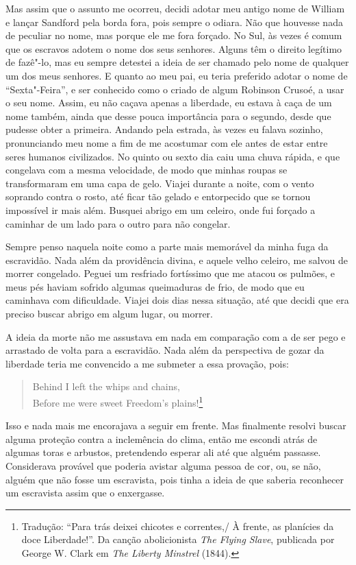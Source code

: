 Mas assim que o assunto me ocorreu, decidi adotar meu antigo nome de
William e lançar Sandford pela borda fora, pois sempre o odiara. Não que
houvesse nada de peculiar no nome, mas porque ele me fora forçado. No
Sul, às vezes é comum que os escravos adotem o nome dos seus senhores.
Alguns têm o direito legítimo de fazê"-lo, mas eu sempre detestei a ideia
de ser chamado pelo nome de qualquer um dos meus senhores. E quanto ao
meu pai, eu teria preferido adotar o nome de ``Sexta"-Feira'', e ser
conhecido como o criado de algum Robinson Crusoé, a usar o seu nome. 
Assim, eu não caçava apenas a liberdade, eu estava à caça de um nome
também, ainda que desse pouca importância para o segundo, desde que
pudesse obter a primeira. Andando pela estrada, às vezes eu falava
sozinho, pronunciando meu nome a fim de me acostumar com ele antes de
estar entre seres humanos civilizados. No quinto ou sexto dia caiu uma
chuva rápida, e que congelava com a mesma velocidade, de modo que minhas
roupas se transformaram em uma capa de gelo. Viajei durante a noite, com
o vento soprando contra o rosto, até ficar tão gelado e entorpecido que
se tornou impossível ir mais além. Busquei abrigo em um celeiro, onde
fui forçado a caminhar de um lado para o outro para não congelar.

Sempre penso naquela noite como a parte mais memorável da minha fuga da
escravidão. Nada além da providência divina, e aquele velho celeiro, me
salvou de morrer congelado. Peguei um resfriado fortíssimo que me atacou
os pulmões, e meus pés haviam sofrido algumas queimaduras de frio, de
modo que eu caminhava com dificuldade. Viajei dois dias nessa situação,
até que decidi que era preciso buscar abrigo em algum lugar, ou morrer.

A ideia da morte não me assustava em nada em comparação com a de ser
pego e arrastado de volta para a escravidão. Nada além da perspectiva de
gozar da liberdade teria me convencido a me submeter a essa provação,
pois:

\pagebreak

\begin{verse}
Behind I left the whips and chains,\\
Before me were sweet Freedom's plains!\footnote{Tradução: ``Para trás deixei chicotes e correntes,/ À frente, as planícies da doce Liberdade!''. Da canção abolicionista \emph{The Flying
  Slave}, publicada por George W. Clark em \emph{The Liberty Minstrel} (1844).}
\end{verse}

Isso e nada mais me encorajava a seguir em frente. Mas finalmente
resolvi buscar alguma proteção contra a inclemência do clima, então me
escondi atrás de algumas toras e arbustos, pretendendo esperar ali até
que alguém passasse. Considerava provável que poderia avistar alguma
pessoa de cor, ou, se não, alguém que não fosse um escravista, pois
tinha a ideia de que saberia reconhecer um escravista assim que o
enxergasse.

